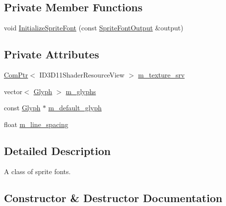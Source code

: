 \subsection*{Private Member Functions}
\begin{DoxyCompactItemize}
\item 
void \hyperlink{classmage_1_1_sprite_font_ae0edccbf98f4bd3b3195fa602baee121}{Initialize\+Sprite\+Font} (const \hyperlink{structmage_1_1_sprite_font_output}{Sprite\+Font\+Output} \&output)
\end{DoxyCompactItemize}
\subsection*{Private Attributes}
\begin{DoxyCompactItemize}
\item 
\hyperlink{namespacemage_ae74f374780900893caa5555d1031fd79}{Com\+Ptr}$<$ I\+D3\+D11\+Shader\+Resource\+View $>$ \hyperlink{classmage_1_1_sprite_font_a0f52f8845cb204d4ca3b3f3020df0029}{m\+\_\+texture\+\_\+srv}
\item 
vector$<$ \hyperlink{structmage_1_1_glyph}{Glyph} $>$ \hyperlink{classmage_1_1_sprite_font_acf4efc927a2ca3fc0eb297ed080ddfbb}{m\+\_\+glyphs}
\item 
const \hyperlink{structmage_1_1_glyph}{Glyph} $\ast$ \hyperlink{classmage_1_1_sprite_font_ad25667d3bfb539b71b39124fdc8ed6d6}{m\+\_\+default\+\_\+glyph}
\item 
float \hyperlink{classmage_1_1_sprite_font_a2b6de0c210a7cf5c72dd1bb69bff7a3b}{m\+\_\+line\+\_\+spacing}
\end{DoxyCompactItemize}


\subsection{Detailed Description}
A class of sprite fonts. 

\subsection{Constructor \& Destructor Documentation}
\hypertarget{classmage_1_1_sprite_font_a081eb41de898a96ecd8f0b5bde3987d9}{}\label{classmage_1_1_sprite_font_a081eb41de898a96ecd8f0b5bde3987d9} 
